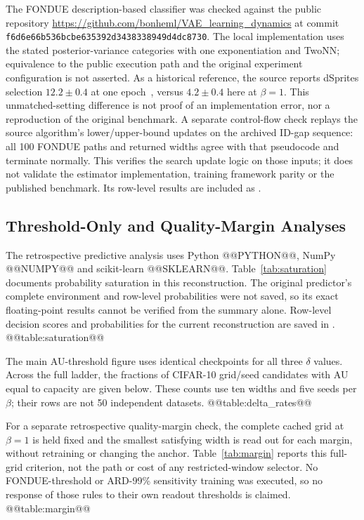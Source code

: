 The FONDUE description-based classifier was checked against the public
repository \url{https://github.com/bonheml/VAE_learning_dynamics} at
commit \texttt{f6d6e66b536bcbe635392d3438338949d4dc8730}. The local
implementation uses the stated posterior-variance categories with one
exponentiation and TwoNN; equivalence to the public execution path and
the original experiment configuration is not asserted. As a historical
reference, the source reports dSprites selection $12.2\pm0.4$ at one
epoch~\cite{bonheme2022fondue}, versus $4.2\pm0.4$ here at $\beta=1$.
This unmatched-setting difference is not proof of an implementation
error, nor a reproduction of the original benchmark.
A separate control-flow check replays the source algorithm's
lower/upper-bound updates on the archived ID-gap sequence: all 100
FONDUE paths and returned widths agree with that pseudocode and
terminate normally. This verifies the search update logic on those
inputs; it does not validate the estimator implementation, training
framework parity or the published benchmark. Its row-level results
are included as .

\subsection{Threshold-Only and Quality-Margin Analyses}\label{app:sensitivity}
The retrospective predictive analysis uses Python @@PYTHON@@,
NumPy @@NUMPY@@ and scikit-learn @@SKLEARN@@. Table~\ref{tab:saturation}
documents probability saturation in this reconstruction. The original
predictor's complete environment and row-level probabilities were not
saved, so its exact floating-point results cannot be verified from the
summary alone. Row-level decision scores and probabilities for the
current reconstruction are saved in .
@@table:saturation@@

The main AU-threshold figure uses identical checkpoints for all three
$\delta$ values. Across the full ladder, the fractions of CIFAR-10
grid/seed candidates with AU equal to capacity are given below.
These counts use ten widths and five seeds per $\beta$; their rows are
not 50 independent datasets.
@@table:delta_rates@@

For a separate retrospective quality-margin check, the complete cached
grid at $\beta=1$ is held fixed and the smallest satisfying width is read
out for each margin, without retraining or changing the anchor.
Table~\ref{tab:margin} reports this full-grid criterion, not the path or
cost of any restricted-window selector. No FONDUE-threshold or ARD-99\%
sensitivity training was executed, so no response of those rules to their
own readout thresholds is claimed.
@@table:margin@@

